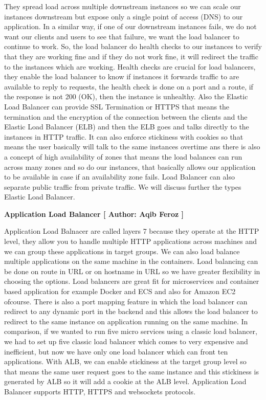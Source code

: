 They spread load across multiple downstream instances so we can scale our instances downstream but expose only a single point of access (DNS) to our application. In a similar way, if one of our downstream instances fails, we do not want our clients and users to see that failure, we want the load balancer to continue to work. So, the load balancer do health checks to our instances to verify that they are working fine and if they do not work fine, it will redirect the traffic to the instances which are working. Health checks are crucial for load balancers, they enable the load balancer to know if instances it forwards traffic to are available to reply to requests, the health check is done on a port and a route, if the response is not 200 (OK), then the instance is unhealthy. Also the Elastic Load Balancer can provide SSL Termination or HTTPS that means the termination and the encryption of the connection between the clients and the Elastic Load Balancer (ELB) and then the ELB goes and talks directly to the instances in HTTP traffic. It can also enforce stickiness with cookies so that means the user basically will talk to the same instances overtime ans there is also a concept of high availability of zones that means the load balances can run across many zones and so do our instances, that basically allows our application to be available in case if an availability zone fails. Load Balancer can also separate public traffic from private traffic. We will discuss further the types Elastic Load Balancer.

\textbf{Application Load Balancer [ Author: Aqib Feroz ]}

Application Load Balnacer are called layers 7 because they operate at the HTTP level, they allow you to handle multiple HTTP applications across machines and we can group these applications in target groups. We can also load balance multiple applications on the same machine in the containers. Load balancing can be done on route in URL or on hostname in URL so we have greater flexibility in choosing the options. Load balancers are great fit for microservices and container based application for example Docker and ECS and also for Amazon EC2 ofcourse. There is also a port mapping feature in which the load balancer can redirect to any dynamic port in the backend and this allows the load balancer to redirect to the same instance on application running on the same machine. In comparison, if we wanted to run five micro services using a classic load balancer, we had to set up five classic load balancer which comes to very expensive and inefficient, but now we have only one load balancer which can front ten applications.
With ALB, we can enable stickiness at the target group level so that means the same user request goes to the same instance and this stickiness is generated by ALB so it will add a cookie at the ALB level. Application Load Balancer supports HTTP, HTTPS and websockets protocols.

